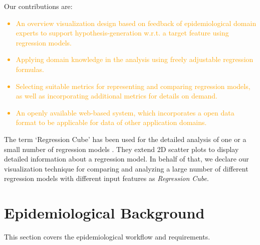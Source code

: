 \documentclass[journal]{style/vgtc} 			          %
\newcommand{\design}[1]{\textcolor{orange}{#1}}
\begin{document}
Our contributions are:

\design{
\begin{itemize}
  \item An overview visualization design based on feedback of epidemiological domain experts to support hypothesis-generation w.r.t. a target feature using regression models.
  \item Applying domain knowledge in the analysis using freely adjustable regression formulas.
  \item Selecting suitable metrics for representing and comparing regression models, as well as incorporating additional metrics for details on demand.
  \item An openly available web-based system, which incorporates a open data format to be applicable for data of other application domains.
\end{itemize}
}
\noindent The term `Regression Cube' has been used for the detailed analysis of one or a small number of regression models \cite{Ahmadi, Chan}.
They extend 2D scatter plots to display detailed information about a regression model.
In behalf of that, we declare our visualization technique for comparing and analyzing a large number of different regression models with different input features as \emph{Regression Cube}.
\section{Epidemiological Background} \label{sec:Background}
This section covers the epidemiological workflow and requirements.
\end{document}

